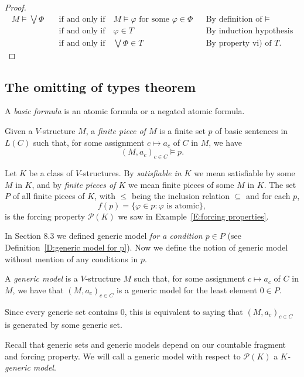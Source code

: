 \documentclass{scrartcl}
\renewcommand{\phi}{\varphi}
\newcommand{\SP}{\mathscr{P}}
\begin{document}
\begin{proof}
\begin{align*}
M \models \bigvee \Phi \quad & \text{if and only if} \quad M \models \phi \text{ for some } \phi\in \Phi &&\text{By definition of $\models$}\\
&\text{if and only if} \quad  \phi\in T  &&\text{By induction hypothesis}\\
&\text{if and only if} \quad  \bigvee \Phi \in T   &&\text{By property vi) of $T$}.
\end{align*}

\end{proof}

\subsection{The omitting of types theorem}

\begin{definition}
A \emph{basic formula} is an atomic formula or a negated atomic formula.

Given a $V$-structure $M$, a \emph{finite piece of $M$} is a finite set $p$ of basic sentences in $L(C)$ such that, for some assignment $c\mapsto a_c$ of $C$ in $M$, we have
\[
(M, a_c)_{c\in C} \models p.
\]
\end{definition}

Let $K$ be a class of $V$-structures. By \emph{satisfiable in $K$} we mean satisfiable by some $M$ in $K$, and by \emph{finite pieces of $K$} we mean finite pieces of some $M$ in $K$. The set $P$ of all finite pieces of $K$, with $\le$ being the inclusion relation $\subseteq$ and for each $p$,
\[
f(p) = \{ \phi \in p \colon \phi \text{ is atomic} \},
\]
is the forcing property $\SP(K)$ we saw in Example~\ref{E:forcing properties}.


In Section 8.3 we defined generic model \emph{for a condition $p\in P$} (see Definition~\ref{D:generic model for p}). Now we define the notion of generic model without mention of any conditions in $p$.

\begin{definition}
A \emph{generic model} is a $V$-structure $M$ such that, for some assignment $c\mapsto a_c$ of $C$ in $M$, we have that $(M,a_c)_{c\in C}$ is a generic model for the least element $0\in P$.

Since every generic set contains $0$, this is equivalent to saying that $(M,a_c)_{c\in C}$ is generated by some generic set.
\end{definition}


Recall that generic sets and generic models depend on our countable fragment and forcing property. We will call a generic model with respect to $\SP(K)$ a \emph{$K$-generic model}.
\end{document}

